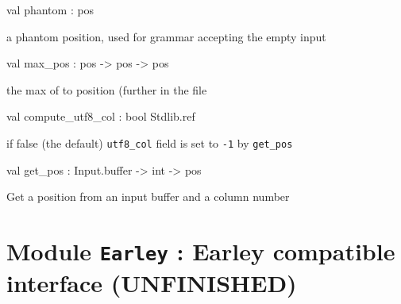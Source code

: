 \documentclass[11pt]{article}
\begin{document}
\label{val:Position.phantom}\begin{ocamldoccode}
val phantom : pos
\end{ocamldoccode}
\begin{ocamldocdescription}
a phantom position, used for grammar accepting the empty input


\end{ocamldocdescription}




\label{val:Position.max-underscorepos}\begin{ocamldoccode}
val max_pos : pos -> pos -> pos
\end{ocamldoccode}
\begin{ocamldocdescription}
the max of to position (further in the file


\end{ocamldocdescription}




\label{val:Position.compute-underscoreutf8-underscorecol}\begin{ocamldoccode}
val compute_utf8_col : bool Stdlib.ref
\end{ocamldoccode}
\begin{ocamldocdescription}
if false (the default) {\tt{utf8\_col}} field is set to {\tt{-1}} by {\tt{get\_pos}}


\end{ocamldocdescription}




\label{val:Position.get-underscorepos}\begin{ocamldoccode}
val get_pos : Input.buffer -> int -> pos
\end{ocamldoccode}
\begin{ocamldocdescription}
Get a position from an input buffer and a column number


\end{ocamldocdescription}


\section{Module {\tt{Earley}} : Earley compatible interface (UNFINISHED) }
\label{module:Earley}




\ocamldocvspace{0.5cm}
\end{document}
